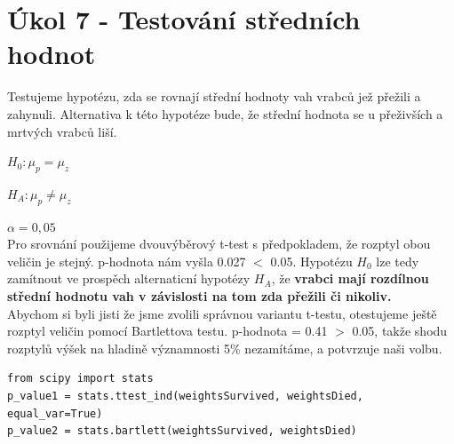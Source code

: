 \documentclass[12pt,a4paper]{article}
\begin{document}
\section{Úkol 7 - Testování středních hodnot}
Testujeme hypotézu, zda se rovnají střední hodnoty vah vrabců jež přežili a zahynuli. Alternativa k této hypotéze bude, že střední hodnota se u přeživších a mrtvých vrabců liší.

$H_0: \mu_p = \mu_z$

$H_A: \mu_p \neq \mu_z$

$\alpha = 0,05$\\

Pro srovnání použijeme dvouvýběrový t-test s předpokladem, že rozptyl obou veličin je stejný. p-hodnota nám vyšla 0.027 $<$ 0.05. Hypotézu $H_0$ lze tedy zamítnout ve prospěch alternaticní hypotézy $H_A$, že \textbf{vrabci mají rozdílnou střední hodnotu vah v závislosti na tom zda přežili či nikoliv.} \\

Abychom si byli jisti že jsme zvolili správnou variantu t-testu, otestujeme ještě rozptyl veličin pomocí Bartlettova testu. p-hodnota = 0.41 $>$ 0.05, takže shodu rozptylů výšek na hladině významnosti 5\% nezamítáme, a potvrzuje naši volbu.\par \bigskip
{}
\begin{lstlisting}
from scipy import stats
p_value1 = stats.ttest_ind(weightsSurvived, weightsDied, equal_var=True)
p_value2 = stats.bartlett(weightsSurvived, weightsDied)
\end{lstlisting}
\end{document}
